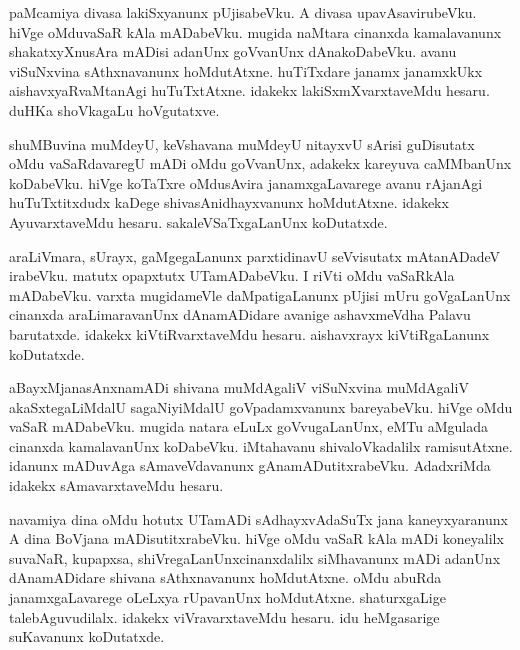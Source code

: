 \documentclass{article}
\begin{document}
\begin{mn}
paMcamiya  divasa  lakiSxyanunx  pUjisabeVku.  A  divasa  upavAsavirubeVku.  
hiVge  oMduvaSaR  kAla  mADabeVku.  mugida  naMtara  cinanxda  kamalavanunx  
shakatxyXnusAra  mADisi  adanUnx  goVvanUnx  dAnakoDabeVku.  avanu  viSuNxvina  
sAthxnavanunx  hoMdutAtxne.  huTiTxdare  janamx janamxkUkx  aishavxyaRvaMtanAgi  
huTuTxtAtxne.  idakekx  lakiSxmXvarxtaveMdu  hesaru.  duHKa shoVkagaLu  hoVgutatxve.
\end{mn}

\begin{mn}
shuMBuvina  muMdeyU,  keVshavana  muMdeyU  nitayxvU  sArisi  guDisutatx  oMdu  
vaSaRdavaregU  mADi  oMdu  goVvanUnx,  adakekx  kareyuva  caMMbanUnx  koDabeVku.  
hiVge  koTaTxre  oMdusAvira  janamxgaLavarege  avanu  rAjanAgi huTuTxtitxdudx  
kaDege  shivasAnidhayxvanunx  hoMdutAtxne.  idakekx  AyuvarxtaveMdu  hesaru.  
sakaleVSaTxgaLanUnx  koDutatxde.
\end{mn}

\begin{mn}
araLiVmara, sUrayx,  gaMgegaLanunx  parxtidinavU  seVvisutatx  mAtanADadeV  irabeVku.  
matutx  opapxtutx  UTamADabeVku.  I riVti  oMdu  vaSaRkAla  mADabeVku.  varxta  
mugidameVle  daMpatigaLanunx  pUjisi  mUru  goVgaLanUnx  cinanxda  araLimaravanUnx  
dAnamADidare  avanige  ashavxmeVdha  Palavu  barutatxde.  idakekx  kiVtiRvarxtaveMdu  
hesaru.  aishavxrayx  kiVtiRgaLanunx  koDutatxde.
\end{mn}

\begin{mn}
aBayxMjanasAnxnamADi  shivana  muMdAgaliV  viSuNxvina  muMdAgaliV  akaSxtegaLiMdalU  
sagaNiyiMdalU  goVpadamxvanunx  bareyabeVku.  hiVge  oMdu  vaSaR  mADabeVku.  mugida  
natara  eLuLx  goVvugaLanUnx,  eMTu  aMgulada  cinanxda  kamalavanUnx  koDabeVku.  
iMtahavanu  shivaloVkadalilx  ramisutAtxne.  idanunx  mADuvAga  sAmaveVdavanunx  
gAnamADutitxrabeVku.  AdadxriMda  idakekx  sAmavarxtaveMdu  hesaru.
\end{mn}

\begin{mn}
navamiya  dina  oMdu  hotutx  UTamADi  sAdhayxvAdaSuTx  jana  kaneyxyaranunx  A  dina  
BoVjana mADisutitxrabeVku.  hiVge  oMdu  vaSaR  kAla  mADi  koneyalilx  suvaNaR,  
kupapxsa,  shiVregaLanUnxcinanxdalilx  siMhavanunx  mADi  adanUnx  dAnamADidare  
shivana  sAthxnavanunx  hoMdutAtxne.  oMdu  abuRda  janamxgaLavarege  oLeLxya  
rUpavanUnx  hoMdutAtxne.  shaturxgaLige  talebAguvudilalx.  idakekx  
viVravarxtaveMdu  hesaru.  idu  heMgasarige  suKavanunx  koDutatxde.
\end{mn}
\end{document}

